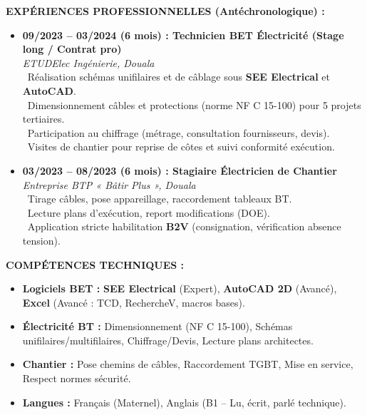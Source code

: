 \documentclass[11pt]{article}
\begin{document}
\begin{exoresolu}
    \textbf{EXPÉRIENCES PROFESSIONNELLES (Antéchronologique) :}
    \begin{itemize}
        \item \textbf{09/2023 -- 03/2024 (6 mois) : Technicien BET Électricité (Stage long / Contrat pro)} \\
              \textit{ETUDElec Ingénierie, Douala} \\
              \textbullet\ Réalisation schémas unifilaires et de câblage sous \textbf{SEE Electrical} et \textbf{AutoCAD}. \\
              \textbullet\ Dimensionnement câbles et protections (norme NF C 15-100) pour 5 projets tertiaires. \\
              \textbullet\ Participation au chiffrage (métrage, consultation fournisseurs, devis). \\
              \textbullet\ Visites de chantier pour reprise de côtes et suivi conformité exécution.
        \item \textbf{03/2023 -- 08/2023 (6 mois) : Stagiaire Électricien de Chantier} \\
              \textit{Entreprise BTP « Bâtir Plus », Douala} \\
              \textbullet\ Tirage câbles, pose appareillage, raccordement tableaux BT. \\
              \textbullet\ Lecture plans d'exécution, report modifications (DOE). \\
              \textbullet\ Application stricte habilitation \textbf{B2V} (consignation, vérification absence tension).
    \end{itemize}

    \textbf{COMPÉTENCES TECHNIQUES :}
    \begin{itemize}
        \item \textbf{Logiciels BET :} \textbf{SEE Electrical} (Expert), \textbf{AutoCAD 2D} (Avancé), \textbf{Excel} (Avancé : TCD, RechercheV, macros bases).
        \item \textbf{Électricité BT :} Dimensionnement (NF C 15-100), Schémas unifilaires/multifilaires, Chiffrage/Devis, Lecture plans architectes.
        \item \textbf{Chantier :} Pose chemins de câbles, Raccordement TGBT, Mise en service, Respect normes sécurité.
        \item \textbf{Langues :} Français (Maternel), Anglais (B1 -- Lu, écrit, parlé technique).
    \end{itemize}


\end{exoresolu}
\end{document}
